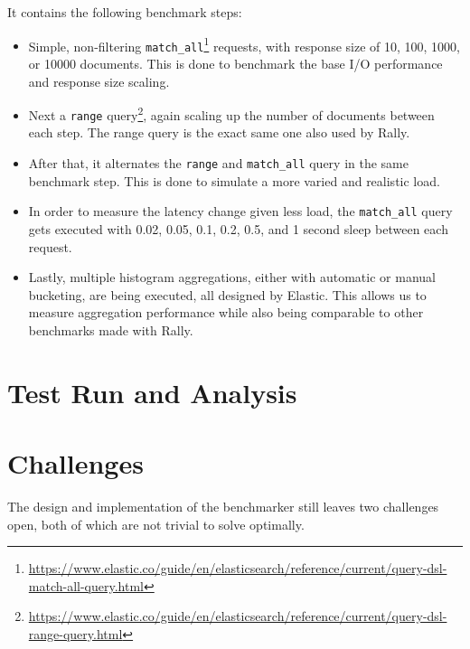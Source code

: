 It contains the following benchmark steps:
\begin{itemize}
  \item Simple, non-filtering \texttt{match\_all}\footnote{\url{https://www.elastic.co/guide/en/elasticsearch/reference/current/query-dsl-match-all-query.html}} requests, with response size of 10, 100, 1000, or 10000 documents. This is done to benchmark the base I/O performance and response size scaling.
  \item Next a \texttt{range} query\footnote{\url{https://www.elastic.co/guide/en/elasticsearch/reference/current/query-dsl-range-query.html}}, again scaling up the number of documents between each step. The range query is the exact same one also used by Rally.
  \item After that, it alternates the \texttt{range} and \texttt{match\_all} query in the same benchmark step. This is done to simulate a more varied and realistic load.
  \item In order to measure the latency change given less load, the \texttt{match\_all} query gets executed with 0.02, 0.05, 0.1, 0.2, 0.5, and 1 second sleep between each request.
  \item Lastly, multiple histogram aggregations, either with automatic or manual bucketing, are being executed, all designed by Elastic. This allows us to measure aggregation performance while also being comparable to other benchmarks made with Rally.
\end{itemize}

\section{Test Run and Analysis}
%

\section{Challenges}
The design and implementation of the benchmarker still leaves two challenges open, both of which are not trivial to solve optimally.

